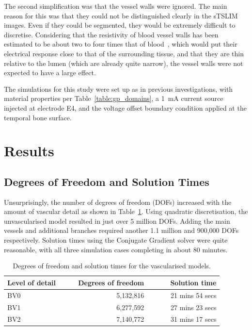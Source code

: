 The second simplification was that the vessel walls were ignored. The main
reason for this was that they could not be distinguished clearly in the sTSLIM
images. Even if they could be segmented, they would be extremely difficult to
discretise. Considering that the resistivity of blood vessel walls has been
estimated to be about two to four times that of blood~\cite{edgerton1975}, which
would put their electrical response close to that of the surrounding tissue, and
that they are thin relative to the lumen (which are already quite narrow), the
vessel walls were not expected to have a large effect.

The simulations for this study were set up as in previous investigations, with
material properties per Table~\ref{table:gp_domains}, a 1~mA current source
injected at electrode E4, and the voltage offset boundary condition applied at
the temporal bone surface.

\section{Results}

\subsection{Degrees of Freedom and Solution Times}

Unsurprisingly, the number of degrees of freedom (DOFs) increased with the
amount of vascular detail as shown in Table~\ref{table:bv_solution_times}.
Using quadratic discretisation, the unvascularised model resulted in just over 5
million DOFs. Adding the main vessels and additional branches required another
1.1 million and 900,000 DOFs respectively. Solution times using the Conjugate
Gradient solver were quite reasonable, with all three simulation cases
completing in about 80 minutes.

\begin{table}
	\centering
	\sffamily
	\small
	
	\caption[Degrees of freedom and solution times for the vascularised
	models]{Degrees of freedom and solution times for the vascularised
	models.}
	\label{table:bv_solution_times}
	
    \begin{tabular}{l r r}
		\toprule
		\textbf{Level of detail~~~~}	& \textbf{Degrees of freedom}
			& \textbf{~~~~~Solution time} \\
		\midrule
		
		BV0	&	5,132,816	& 21 mins 54 secs \\
		BV1	&	6,277,592	& 27 mins 23 secs \\
		BV2	&	7,140,772	& 31 mins 17 secs \\
		\bottomrule
	\end{tabular}
	\bigskip
\end{table}

